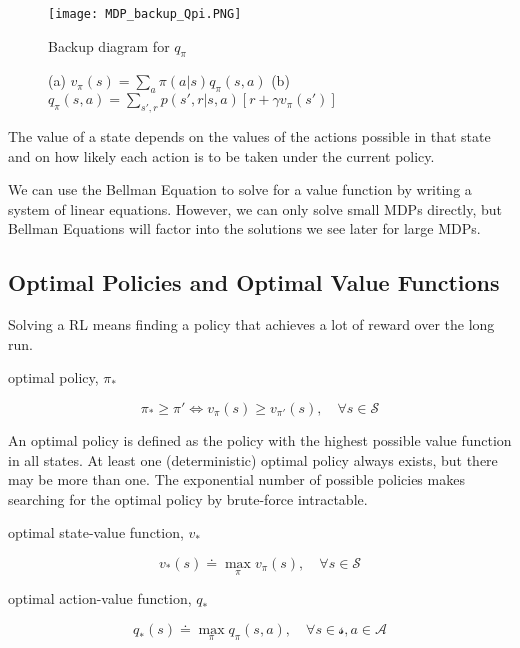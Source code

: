 \documentclass[lang=en,mode=geye,device=normal,color=blue,14pt]{elegantnote}
\DeclareMathOperator*{\1}{\mathbbm{1}}
\begin{document}
\begin{figure}[!h]
  \centering
  \texttt{[image: MDP\_backup\_Qpi.PNG]}
  \caption{Backup diagram for $q_\pi$}
  \label{fig:MDP_backup_qpi}
\end{figure}

\begin{figure}[!h]
    \centering
    \caption{ (a) $ v_\pi(s)=\sum_a \pi(a|s)q_\pi(s,a) $ (b) $ q_\pi(s,a)=\sum_{s',r}p(s',r|s,a)[r+\gamma v_\pi(s')] $ }
    \label{fig:MDPMDP}
\end{figure}
The value of a state depends on the values of the actions possible in that state and on how likely each action is to be taken under the current policy.

We can use the Bellman Equation to solve for a value function by writing a system of linear equations. However, we can only solve small MDPs directly, but Bellman Equations will factor into the solutions we see later for large MDPs.

\subsection{Optimal Policies and Optimal Value Functions}

Solving a RL means finding a policy that achieves a lot of reward over the long run.

\begin{definition}
optimal policy, $\pi_*$

$$ \pi_* \geq \pi' \iff v_\pi(s) \geq v_{\pi'}(s), \quad \forall s \in \mathcal{S} $$
\end{definition}
An optimal policy is defined as the policy with the highest possible value function in all states. At least one (deterministic) optimal policy always exists, but there may be more than one. The exponential number of possible policies makes searching for the optimal policy by brute-force intractable.

\begin{definition}
optimal state-value function, $v_*$

$$ v_*(s) \doteq \max_\pi v_\pi(s), \quad \forall s \in \mathcal{S} $$
\end{definition}

\begin{definition}
optimal action-value function, $q_*$

$$ q_*(s) \doteq \max_\pi q_\pi(s,a), \quad \forall s \in \mathcal{s}, a \in \mathcal{A} $$
\end{definition}
\end{document}
